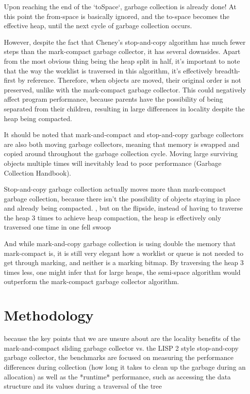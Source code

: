 \documentclass[index]{subfiles}
\begin{document}
Upon reaching the end of the `toSpace`, garbage collection is already done! At this point the from-space is basically ignored, and the to-space becomes the effective heap, until the next cycle of garbage collection occurs.

However, despite the fact that Cheney's stop-and-copy algorithm has much fewer steps than the mark-compact garbage collector, it has several downsides. Apart from the most obvious thing being the heap split in half, it's important to note that the way the worklist is traversed in this algorithm, it's effectively breadth-first by reference. Therefore, when objects are moved, their original order is not preserved, unlike with the mark-compact garbage collector. This could negatively affect program performance, because parents have the possibility of being separated from their children, resulting in large differences in locality despite the heap being compacted.

It should be noted that mark-and-compact and stop-and-copy garbage collectors are also both moving garbage collectors, meaning that memory is swapped and copied around throughout the garbage collection cycle. Moving large  surviving objects multiple times will inevitably lead to poor performance (Garbage Collection Handbook).

Stop-and-copy garbage collection actually moves more than mark-compact garbage collection, because there isn't the possibility of objects staying in place and already being compacted. , but on the flipside, instead of having to traverse the heap 3 times to achieve heap compaction, the heap is effectively only traversed one time in one fell swoop

And while mark-and-copy garbage collection is using double the memory that mark-compact is, it is still very elegant how a worklist or queue is not needed to  get through marking, and neither is a marking bitmap. By traversing the heap 3 times less, one might infer that for large heaps, the semi-space algorithm would outperform the mark-compact garbage collector algorithm.

\section{Methodology}

because the key points that we are unsure about are the locality benefits of the mark-and-compact sliding garbage collector vs. the LISP 2 style stop-and-copy garbage collector, the benchmarks are focused on measuring the performance differences during collection (how long it takes to clean up the garbage during an allocation) as well as the *runtime* performance, such as accessing the data structure and its values during a traversal of the tree
\end{document}
